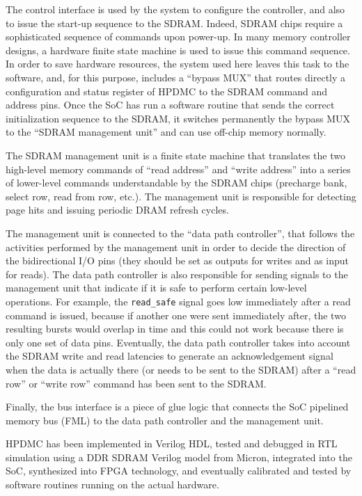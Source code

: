 \documentclass[a4paper,11pt]{kthesis}
\begin{document}
The control interface is used by the system to configure the controller, and also to issue the start-up sequence to the SDRAM. Indeed, SDRAM chips require a sophisticated sequence of commands upon power-up. In many memory controller designs, a hardware finite state machine is used to issue this command sequence. In order to save hardware resources, the system used  here leaves this task to the software, and, for this purpose, includes a ``bypass MUX'' that routes directly a configuration and status register of HPDMC to the SDRAM command and address pins. Once the SoC has run a software routine that sends the correct initialization sequence to the SDRAM, it switches permanently the bypass MUX to the ``SDRAM management unit'' and can use off-chip memory normally.

The SDRAM management unit is a finite state machine that translates the two high-level memory commands of ``read address'' and ``write address'' into a series of lower-level commands understandable by the SDRAM chips (precharge bank, select row, read from row, etc.). The management unit is responsible for detecting page hits and issuing periodic DRAM refresh cycles.

The management unit is connected to the ``data path controller'', that follows the activities performed by the management unit in order to decide the direction of the bidirectional I/O pins (they should be set as outputs for writes and as input for reads). The data path controller is also responsible for sending signals to the management unit that indicate if it is safe to perform certain low-level operations. For example, the \verb!read_safe! signal goes low immediately after a read command is issued, because if another one were sent immediately after, the two resulting bursts would overlap in time and this could not work because there is only one set of data pins. Eventually, the data path controller takes into account the SDRAM write and read latencies to generate an acknowledgement signal when the data is actually there (or needs to be sent to the SDRAM) after a ``read row'' or ``write row'' command has been sent to the SDRAM.

Finally, the bus interface is a piece of glue logic that connects the SoC pipelined memory bus (FML) to the data path controller and the management unit.

HPDMC has been implemented in Verilog HDL, tested and debugged in RTL simulation using a DDR SDRAM Verilog model from Micron, integrated into the SoC, synthesized into FPGA technology, and eventually calibrated and tested by software routines running on the actual hardware.
\end{document}
